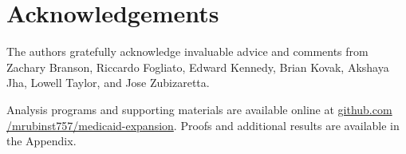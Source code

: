 \documentclass[aoas]{imsart}
\theoremstyle{plain}
\theoremstyle{remark}
\begin{document}
\section*{Acknowledgements}

The authors gratefully acknowledge invaluable advice and comments from Zachary Branson, Riccardo Fogliato, Edward Kennedy, Brian Kovak, Akshaya Jha, Lowell Taylor, and Jose Zubizaretta.

\begin{supplement}
Analysis programs and supporting materials are available online at \url{github.com /mrubinst757/medicaid-expansion}. Proofs and additional results are available in the Appendix.
\end{supplement}

\end{document}
